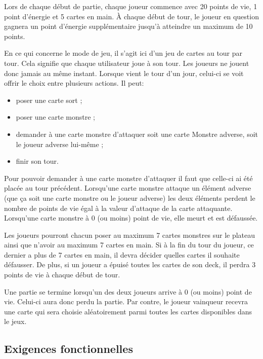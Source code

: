 \documentclass[11pt,a4paper]{article}
\begin{document}
Lors de chaque début de partie, chaque joueur commence avec 20 points de vie, 1 point d'énergie et 5 cartes en main. À chaque début de tour, le joueur en question gagnera un point d'énergie supplémentaire jusqu'à atteindre un maximum de 10 points. 

\medbreak

En ce qui concerne le mode de jeu, il s'agit ici d'un jeu de cartes au tour par tour.  Cela signifie que chaque utilisateur joue à son tour.  Les joueurs ne jouent donc jamais au même instant.  Lorsque vient le tour d'un jour, celui-ci se voit offrir le choix entre plusieurs actions. Il peut:

\begin{itemize}
 \item[\textbullet] poser une carte sort ;
 \item[\textbullet] poser une carte monstre ;
 \item[\textbullet] demander à une carte monstre d'attaquer soit une carte Monstre adverse, soit le joueur adverse lui-même ;
 \item[\textbullet] finir son tour.
\end{itemize}

Pour pouvoir demander à une carte monstre d'attaquer il faut que celle-ci ai été placée au tour précédent.  Lorsqu'une carte monstre attaque un élément adverse (que ça soit une carte monstre ou le joueur adverse) les deux éléments perdent le nombre de points de vie égal à la valeur d'attaque de la carte attaquante.  Lorsqu'une carte monstre à 0 (ou moins) point de vie, elle meurt et est défaussée.

\medbreak


Les joueurs pourront chacun poser au maximum 7 cartes monstres sur le plateau ainsi que n'avoir au maximum 7 cartes en main. Si à la fin du tour du joueur, ce dernier a plus de 7 cartes en main, il devra décider quelles cartes il souhaite défausser. De plus, si un joueur a épuisé toutes les cartes de son deck, il perdra 3 points de vie à chaque début de tour.

\medbreak

Une partie se termine lorsqu'un des deux joueurs arrive à 0 (ou moins) point de vie.  Celui-ci aura donc perdu la partie.  Par contre, le joueur vainqueur recevra une carte qui sera choisie aléatoirement parmi toutes les cartes disponibles dans le jeux.


\subsection{Exigences fonctionnelles}
\end{document}
